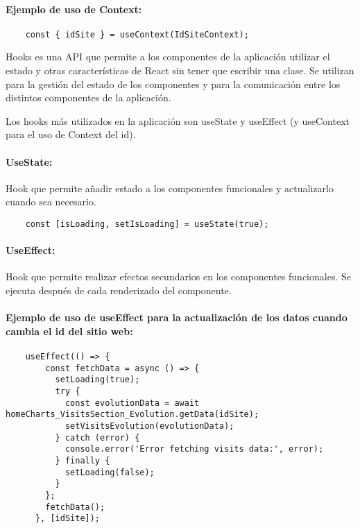 \paragraph{Ejemplo de uso de Context:}   
\begin{verbatim}
    const { idSite } = useContext(IdSiteContext);
\end{verbatim}

Hooks es una API que permite a los componentes de la aplicación utilizar el estado y otras características de React sin tener que
escribir una clase. Se utilizan para la gestión del estado de los componentes y para la comunicación entre los distintos componentes
de la aplicación. 

Los hooks más utilizados en la aplicación son useState y useEffect (y useContext para el uso de Context del id). 

\paragraph{UseState: } Hook que permite añadir estado a los componentes funcionales y actualizarlo cuando sea necesario.

\begin{verbatim}
    const [isLoading, setIsLoading] = useState(true);
\end{verbatim}

\paragraph{UseEffect: } Hook que permite realizar efectos secundarios en los componentes funcionales. Se ejecuta después de cada
renderizado del componente.

\paragraph{Ejemplo de uso de useEffect para la actualización de los datos cuando cambia el id del sitio web:}
\begin{verbatim}
    useEffect(() => {
        const fetchData = async () => {
          setLoading(true);
          try {
            const evolutionData = await homeCharts_VisitsSection_Evolution.getData(idSite); 
            setVisitsEvolution(evolutionData);
          } catch (error) {
            console.error('Error fetching visits data:', error);
          } finally {
            setLoading(false);
          }
        };
        fetchData();
      }, [idSite]);
\end{verbatim}


